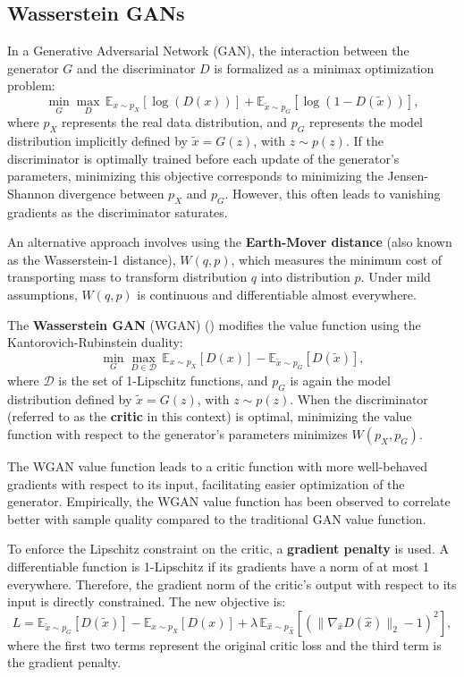 \subsection{Wasserstein GANs}
\label{sec:wgan}

In a Generative Adversarial Network (GAN),
the interaction between the generator \( G \) and the discriminator
\( D \) is formalized as a minimax optimization problem:
\begin{equation}
\min_G \max_D \, \mathbb{E}_{x \sim p_X}[\log(D(x))] + \mathbb{E}_{\tilde{x} \sim p_G}[\log(1 - D(\tilde{x}))],
\end{equation}
where \( p_X \) represents the real data distribution,
and \( p_G \) represents the model distribution implicitly defined by
\(\tilde{x} = G(z)\), with \( z \sim p(z) \). If the discriminator
is optimally trained before each update of the generator's parameters,
minimizing this objective corresponds to minimizing the
Jensen-Shannon divergence between \( p_X \) and \( p_G \).
However, this often leads to vanishing gradients as the discriminator saturates.

An alternative approach involves using the \textbf{Earth-Mover distance}
(also known as the Wasserstein-1 distance),
\( W(q, p) \), which measures the minimum cost of transporting mass
to transform distribution \( q \) into distribution \( p \).
Under mild assumptions, \( W(q, p) \) is continuous and differentiable
almost everywhere.

The \textbf{Wasserstein GAN} (WGAN) (\cite{gulrajani2017}) modifies the value
function using the Kantorovich-Rubinstein duality:
\[
\min_G \max_{D \in \mathcal{D}} \, \mathbb{E}_{x \sim p_X}[D(x)] - \mathbb{E}_{\tilde{x} \sim p_G}[D(\tilde{x})],
\]
where \( \mathcal{D} \) is the set of 1-Lipschitz functions,
and \( p_G \) is again the model distribution defined by \(\tilde{x} = G(z)\),
with \( z \sim p(z) \). When the discriminator (referred to as the \textbf{critic}
in this context) is optimal, minimizing the value function with respect
to the generator's parameters minimizes \( W(p_X, p_G) \).

The WGAN value function leads to a critic function with more well-behaved
gradients with respect to its input, facilitating easier optimization
of the generator. Empirically, the WGAN value function has been observed
to correlate better with sample quality compared to the traditional GAN value
function.

To enforce the Lipschitz constraint on the critic, a \textbf{gradient penalty}
is used.
A differentiable function is 1-Lipschitz if its gradients have a norm of at most
1 everywhere. Therefore, the gradient norm of the critic's output with respect
to its input is directly constrained. The new objective is:
\[
L = \mathbb{E}_{\tilde{x} \sim p_G}[D(\tilde{x})] - \mathbb{E}_{x \sim p_X}[D(x)] + \lambda \, \mathbb{E}_{\hat{x} \sim p_{\hat{X}}}[(\|\nabla_{\hat{x}} D(\hat{x})\|_2 - 1)^2],
\]
where the first two terms represent the original critic loss and the
third term is the gradient penalty.

